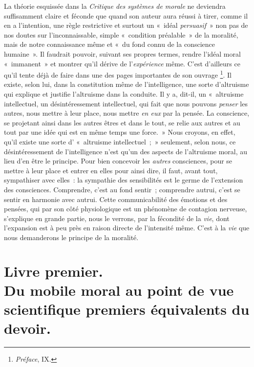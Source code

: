 \documentclass[french,twoside]{book} %
\begin{document}
La théorie esquissée dans la \emph{Critique des systèmes de morale} ne deviendra suffisamment claire et féconde que quand son auteur aura réussi à tirer, comme il en a l’intention, une règle restrictive et surtout un « idéal \emph{persuasif} » non pas de nos doutes sur l’inconnaissable, simple « condition préalable » de la moralité, mais de notre connaissance même et « du fond connu de la conscience humaine ». Il faudrait pouvoir, suivant ses propres termes, rendre l’idéal moral « immanent » et montrer qu’il dérive de l’\emph{expérience} même. C’est d’ailleurs ce qu’il tente déjà de faire dans une des pages importantes de son ouvrage \footnote{\emph{Préface}, IX.}. Il existe, selon lui, dans la constitution même de l’intelligence, une sorte d’altruisme qui explique et justifie l’altruisme dans la conduite. Il y a, dit-il, un « altruisme intellectuel, un désintéressement intellectuel, qui fait que nous pouvons \emph{penser} les autres, nous mettre à leur place, nous mettre \emph{en eux} par la pensée. La conscience, se projetant ainsi dans les autres êtres et dans le tout, se relie aux autres et au tout par une idée qui est en même temps une force. » Nous croyons, en effet, qu’il existe une sorte d’ « altruisme intellectuel ; » seulement, selon nous, ce désintéressement de l’intelligence n’est qu’un des aspects de l’altruisme moral, au lieu d’en être le principe. Pour bien concevoir les \emph{autres} consciences, pour se mettre à leur place et entrer en elles pour ainsi dire, il faut, avant tout, sympathiser avec elles : la sympathie des sensibilités est le germe de l’extension des consciences. Comprendre, c’est au fond sentir ; comprendre autrui, c’est se sentir en harmonie avec autrui. Cette communicabilité des émotions et des pensées, qui par son côté physiologique est un phénomène de contagion nerveuse, s’explique en grande partie, nous le verrons, par la fécondité de la \emph{vie}, dont l’expansion est à peu près en raison directe de l’intensité même. C’est à la \emph{vie} que nous demanderons le principe de la moralité.
\section[{Livre premier. Du mobile moral au point de vue scientifique premiers équivalents du devoir.}]{Livre premier. \\
Du mobile moral au point de vue scientifique premiers équivalents du devoir.}\renewcommand{\leftmark}{Livre premier. \\
Du mobile moral au point de vue scientifique premiers équivalents du devoir.}
\end{document}
